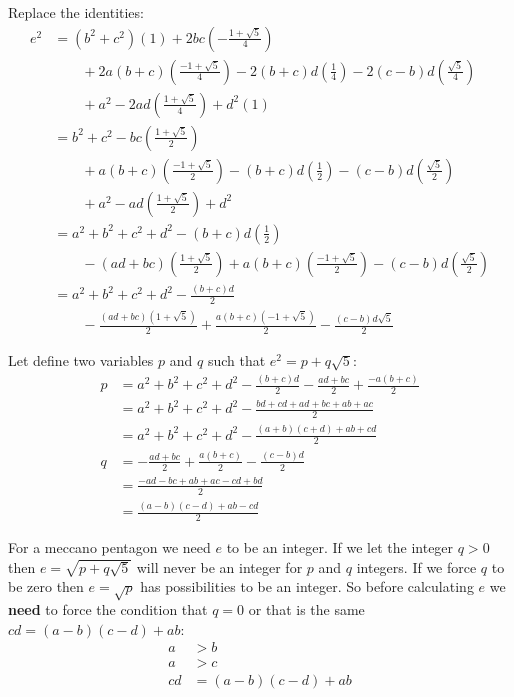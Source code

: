 \documentclass[11pt]{article}
\begin{document}
Replace the identities:
\begin{align*}
e^2 &= (b^2+c^2)(1) + 2bc(-\frac{1 + \sqrt{5}}{4})\\
    &\qquad + 2a(b+c)(\frac{-1+\sqrt{5}}{4}) - 2(b+c)d(\frac{1}{4}) - 2(c-b)d(\frac{\sqrt{5}}{4})\\
    &\qquad + a^2 - 2ad(\frac{1+\sqrt{5}}{4}) + d^2(1)\\
    &= b^2+c^2 - bc(\frac{1 + \sqrt{5}}{2})\\
    &\qquad + a(b+c)(\frac{-1+\sqrt{5}}{2}) - (b+c)d(\frac{1}{2}) - (c-b)d(\frac{\sqrt{5}}{2})\\
    &\qquad + a^2 - ad(\frac{1+\sqrt{5}}{2}) + d^2\\
    &= a^2+b^2+c^2 + d^2 - (b+c)d(\frac{1}{2}) \\
    &\qquad - (ad+bc)(\frac{1 + \sqrt{5}}{2}) + a(b+c)(\frac{-1+\sqrt{5}}{2}) - (c-b)d(\frac{\sqrt{5}}{2})\\
    &= a^2+b^2+c^2 + d^2 - \frac{(b+c)d}{2} \\
    &\qquad - \frac{(ad+bc)(1 + \sqrt{5})}{2} + \frac{a(b+c)(-1+\sqrt{5})}{2} - \frac{(c-b)d\sqrt{5}}{2}
\end{align*}

Let define two variables $p$ and $q$ such that $e^2 = p + q\sqrt{5}$:
\begin{align*}
p &= a^2+b^2+c^2 + d^2 - \frac{(b+c)d}{2} - \frac{ad+bc}{2} + \frac{-a(b+c)}{2}\\
  &= a^2+b^2+c^2 + d^2 - \frac{bd +cd +ad +bc +ab + ac}{2}\\
  &= a^2+b^2+c^2 + d^2 - \frac{(a+b)(c+d)+ab+cd}{2}\\
q &= - \frac{ad+bc}{2} + \frac{a(b+c)}{2} - \frac{(c-b)d}{2}\\
  &= \frac{-ad - bc + ab + ac - cd + bd}{2}\\
  &= \frac{(a-b)(c-d) + ab - cd}{2}
\end{align*}

For a meccano pentagon we need $e$ to be an integer. If we let the integer $q > 0$ then $e = \sqrt{p + q\sqrt{5}}$ will never be an integer for $p$ and $q$ integers. If we force $q$ to be zero then $e = \sqrt{p}$ has possibilities to be an integer.
So before calculating $e$ we \textbf{need} to force the condition that $q = 0$ or that is the same $cd = (a-b)(c-d)+ab$:
\begin{align*}
a  & > b\\
a  & > c\\
cd &= (a-b)(c-d)+ab\\
\end{align*}
\end{document}
